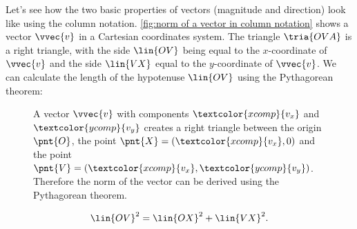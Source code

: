 Let's see how the two basic properties of vectors (magnitude and direction) look like using the column notation. \autoref{fig:norm of a vector in column notation} shows a vector $\vvec{v}$ in a Cartesian coordinates system. The triangle $\tria{OVA}$ is a right triangle, with the side $\lin{OV}$ being equal to the $x$-coordinate of $\vvec{v}$ and the side $\lin{VX}$ equal to the $y$-coordinate of $\vvec{v}$. We can calculate the length of the hypotenuse $\lin{OV}$ using the Pythagorean theorem:

\def\vx{\textcolor{xcomp}{v_{x}}}
\def\vy{\textcolor{ycomp}{v_{y}}}
\begin{figure}
	\begin{center}
	\end{center}
	\caption{A vector $\vvec{v}$ with components $\vx$ and $\vy$ creates a right triangle between the origin $\pnt{O}$, the point $\pnt{X}=(\vx,0)$ and the point $\pnt{V}=(\vx,\vy)$. Therefore the norm of the vector can be derived using the Pythagorean theorem.}
	\label{fig:norm of a vector in column notation}
\end{figure}


\begin{equation}
	\lin{OV}^{2} = \lin{OX}^{2} + \lin{VX}^{2}.
	\label{eq:Pythagorean theorem}
\end{equation}

